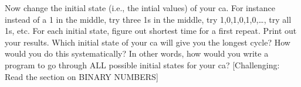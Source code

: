 Now change the initial state (i.e., the intial values) of your ca. For instance instead of a 1 in the middle, try three 1s in the middle, try 1,0,1,0,1,0,\ldots, try all 1s, etc. For each initial state, figure out shortest time for a first repeat. Print out your results. Which initial state of your ca will give you the longest cycle? How would you do this systematically? In other words, how would you write a program to go through ALL possible initial states for your ca? [Challenging: Read the section on BINARY NUMBERS]

